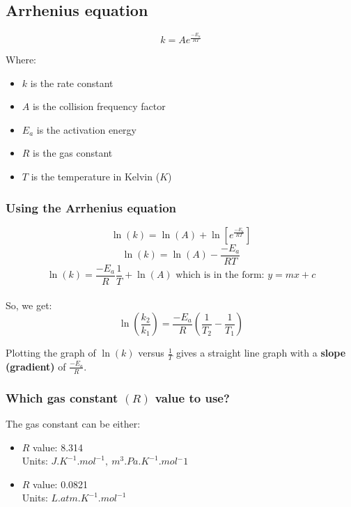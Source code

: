 \documentclass[11pt]{article}
\begin{document}
\newpage

\subsection{Arrhenius equation}
\label{sec:orgfdc35e0}
\[k = Ae^{\frac{-E_a}{RT}}\]

Where:
\begin{itemize}
\item \(k\) is the rate constant
\item \(A\) is the collision frequency factor
\item \(E_a\) is the activation energy
\item \(R\) is the gas constant
\item \(T\) is the temperature in Kelvin (\(\unit{K}\))
\end{itemize}

\subsubsection{Using the Arrhenius equation}
\label{sec:org2095940}
\[\ln (k) = \ln (A) + \ln \left[e^{\frac{-E_a}{RT}} \right]\]
\[\ln (k) = \ln (A) - \frac{-E_a}{RT}\]
\[\ln (k) = \frac{-E_a}{R} \frac{1}{T} + \ln (A) \text{ which is in the form: } y = mx + c\]
\\[0pt]

So, we get:
\[\ln \left( \frac{k_2}{k_1} \right) = \frac{-E_a}{R} \left( \frac{1}{T_2} - \frac{1}{T_1} \right)\]

Plotting the graph of \(\ln(k)\) versus \(\frac{1}{T}\) gives a straight line graph with a \textbf{slope (gradient)} of \(\frac{-E_a}{R}\).

\newpage

\subsubsection{Which gas constant \((R)\) value to use?}
\label{sec:org4f4a121}
The gas constant can be either:

\begin{itemize}
\item \(R\) value: 8.314 \\[0pt]
Units: \(\unit{J.K^{-1}.mol^{-1}}, \ \unit{m^3.Pa.K^{-1}.mol{^-1}}\)

\item \(R\) value: 0.0821 \\[0pt]
Units: \(\unit{L.atm.K^{-1}.mol^{-1}}\)
\end{itemize}
\end{document}
